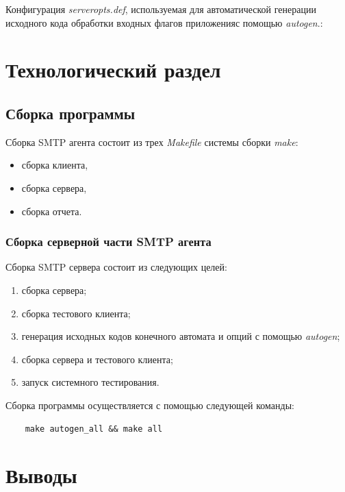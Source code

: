 \documentclass[a4paper,12pt]{report}
\begin{document}
Конфигурация \textit{serveropts.def}, используемая для автоматической генерации исходного кода обработки
входных флагов приложенияс помощью \textit{autogen}.:

\lstset{language=C}


\chapter{Технологический раздел}

\section{Сборка программы}

Сборка SMTP агента состоит из трех \textit{Makefile} системы сборки \textit{make}:

\begin{itemize}
    \item сборка клиента,
    \item сборка сервера,
    \item сборка отчета.
\end{itemize}

\subsection{Сборка серверной части SMTP агента}

Сборка SMTP сервера состоит из следующих целей:

\begin{enumerate}
    \item сборка сервера;
    \item сборка тестового клиента;
    \item генерация исходных кодов конечного автомата и опций с помощью \textit{autogen};
    \item сборка сервера и тестового клиента;
    \item запуск системного тестирования.
\end{enumerate}

Сборка программы осуществляется с помощью следующей команды:
\begin{verbatim}
    make autogen_all && make all
\end{verbatim}



\chapter*{Выводы}
\end{document}
